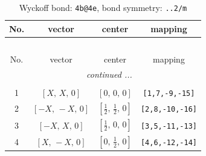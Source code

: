 \documentclass[fleqn,8pt]{jsarticle}
\begin{document}
\begin{longtable}{cccc}
\caption{Wyckoff bond: {\tt 4b@4e}, bond symmetry: {\tt ..2/m}}
 \\
 \hline \hline
No. & vector & center & mapping \\ \hline \endfirsthead

\multicolumn{3}{l}{\tablename\ \thetable{}} \\
 \hline \hline
No. & vector & center & mapping \\ \hline \endhead

 \hline \hline
\multicolumn{3}{r}{\footnotesize\it continued ...} \\ \endfoot

 \hline \hline
\multicolumn{3}{r}{} \\ \endlastfoot

1 & $\left[ X,\, X,\, 0 \right]$ & $\left[ 0,\, 0,\, 0 \right]$ & {\tt [1,7,-9,-15]} \\ \hline
2 & $\left[ - X,\, - X,\, 0 \right]$ & $\left[ \frac{1}{2},\, \frac{1}{2},\, 0 \right]$ & {\tt [2,8,-10,-16]} \\ \hline
3 & $\left[ - X,\, X,\, 0 \right]$ & $\left[ \frac{1}{2},\, 0,\, 0 \right]$ & {\tt [3,5,-11,-13]} \\ \hline
4 & $\left[ X,\, - X,\, 0 \right]$ & $\left[ 0,\, \frac{1}{2},\, 0 \right]$ & {\tt [4,6,-12,-14]} \\
\end{longtable}
\renewcommand{\arraystretch}{1.2}
\end{document}
